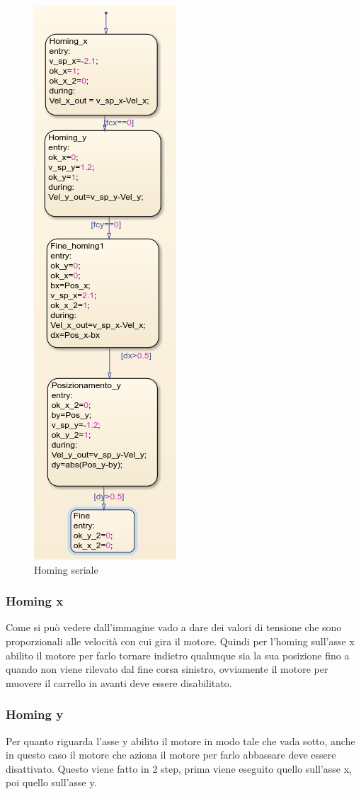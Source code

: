 \documentclass{article}
\begin{document}
\begin{figure}[H]
\centering
\includegraphics[width=.3\textwidth]{./stateflow/homingserial.png}
\caption{Homing seriale}
\end{figure}
\subsubsection{Homing x}
Come si può vedere dall'immagine vado a dare dei valori di tensione che sono proporzionali alle velocità con cui gira il motore. Quindi per l'homing sull'asse x abilito il motore per farlo tornare indietro qualunque sia la sua posizione fino a quando non viene rilevato dal fine corsa sinistro, ovviamente il motore per muovere il carrello in avanti deve essere disabilitato.

\subsubsection{Homing y}

Per quanto riguarda l'asse y abilito il motore in modo tale che vada sotto, anche in questo caso il motore che aziona il motore per farlo abbassare deve essere disattivato. Questo viene fatto in 2 step, prima viene eseguito quello sull'asse x, poi quello sull'asse y.
\end{document}
